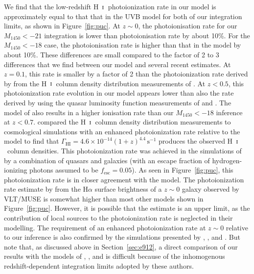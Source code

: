 \documentclass[fleqn,usenatbib]{mnras}
\def\HI{\hbox{H~$\scriptstyle\rm I$}}
\begin{document}
We find that the low-redshift \HI\ photoionization rate in our model
is approximately equal to that that in the \citet{2012ApJ...746..125H}
UVB model for both of our integration limits, as shown in
Figure~\ref{fig:puc}.  At $z\sim 0$, the photoionisation rate for our
$M_{1450}<-21$ integration is lower than \citet{2012ApJ...746..125H}
photoionisation rate by about 10\%.  For the $M_{1450}<-18$ case, the
photoionisation rate is higher than that in the
\citet{2012ApJ...746..125H} model by about 10\%.  These differences
are small compared to the factor of 2 to 3 differences that we find
between our model and several recent estimates.  At $z=0.1$, this rate
is smaller by a factor of 2 than the photoionization rate derived by
\citet{2017MNRAS.467.3172G} from the \HI\ column density distribution
measurements of \citet{2016ApJ...817..111D}.  At $z<0.5$, this
photoionization rate evolution in our model appears lower than also
the rate derived by \citet{2015MNRAS.451L..30K} using the quasar
luminosity function measurements of \citet{2009MNRAS.392...19C} and
\citet{2013A&A...551A..29P}.  The model of \citet{2015ApJ...813L...8M}
also results in a higher ionisation rate than our $M_{1450}<-18$
inference at $z<0.7$.  \citet{2015ApJ...811....3S} compared the
\HI\ column density distribution measurements to cosmological
simulations with an enhanced photoionization rate relative to the
\citet{2012ApJ...746..125H} model to find that
$\Gamma_\mathrm{HI}=4.6\times 10^{-14}(1+z)^{4.4}\,\mathrm{s}^{-1}$
produces the observed \HI\ column densities.  This photoionization
rate was achieved in the simulations of \citet{2015ApJ...811....3S} by
a combination of quasars and galaxies (with an escape fraction of
hydrogen-ionizing photons assumed to be $f_\mathrm{esc}=0.05$).  As
seen in Figure~\ref{fig:puc}, this photoionization rate is in closer
agreement with the \citet{2015ApJ...813L...8M} model.  The
photoionization rate estimate by \citet{2017MNRAS.467.4802F} from the
H$\alpha$ surface brightness of a $z\sim 0$ galaxy observed by
VLT/MUSE is somewhat higher than most other models shown in
Figure~\ref{fig:puc}.  However, it is possible that the
\citet{2017MNRAS.467.4802F} estimate is an upper limit, as the
contribution of local sources to the photoionization rate is neglected
in their modelling.  The requirement of an enhanced photoionization
rate at $z\sim 0$ relative to our inference is also confirmed by the
simulations presented by \citet{2017MNRAS.467L..86V},
\citet{2017ApJ...837..106O}, and \citet{2018arXiv180104931P}.  But
note that, as discussed above in Section~\ref{sec:e912}, a direct
comparison of our results with the models of
\citet{2015ApJ...813L...8M}, \citet{2015MNRAS.451L..30K}, and
\citet{2018arXiv180104931P} is difficult because of the inhomogenous
redshift-dependent integration limits adopted by these authors.
\end{document}
